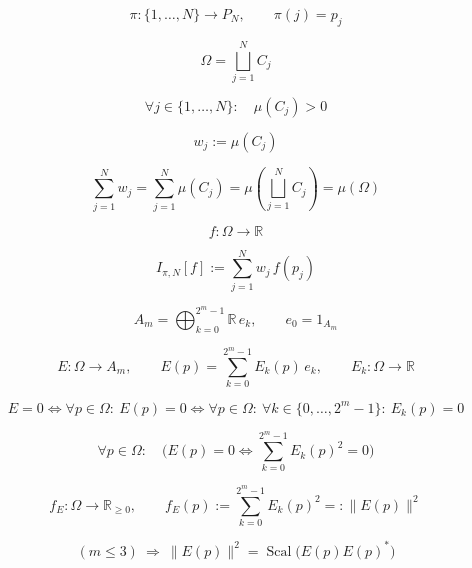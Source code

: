 \documentclass[12pt]{article}
\begin{document}
\begin{equation}
\pi:\{1,\dots,N\}\to P_N,\qquad \pi(j)=p_j
\end{equation}

\begin{equation}
\Omega=\bigsqcup_{j=1}^N C_j
\end{equation}

\begin{equation}
\forall j\in\{1,\dots,N\}:\quad \mu(C_j)>0
\end{equation}

\begin{equation}
w_j:=\mu(C_j)
\end{equation}

\begin{equation}
\sum_{j=1}^N w_j=\sum_{j=1}^N \mu(C_j)=\mu\!\left(\bigsqcup_{j=1}^N C_j\right)=\mu(\Omega)
\end{equation}

\begin{equation}
f:\Omega\to\mathbb{R}
\end{equation}

\begin{equation}
I_{\pi,N}[f]:=\sum_{j=1}^N w_j\,f(p_j)
\end{equation}

\begin{equation}
A_m=\bigoplus_{k=0}^{2^{m}-1}\mathbb{R}\,e_k,\qquad e_0=1_{A_m}
\end{equation}

\begin{equation}
E:\Omega\to A_m,\qquad
E(p)=\sum_{k=0}^{2^{m}-1}E_k(p)\,e_k,\qquad
E_k:\Omega\to\mathbb{R}
\end{equation}

\begin{equation}
E=0
\Longleftrightarrow
\forall p\in\Omega:\ E(p)=0
\Longleftrightarrow
\forall p\in\Omega:\ \forall k\in\{0,\dots,2^{m}-1\}:\ E_k(p)=0
\end{equation}

\begin{equation}
\forall p\in\Omega:\quad
\Big(
E(p)=0
\Longleftrightarrow
\sum_{k=0}^{2^{m}-1}E_k(p)^2=0
\Big)
\end{equation}

\begin{equation}
f_E:\Omega\to\mathbb{R}_{\ge 0},\qquad
f_E(p):=\sum_{k=0}^{2^{m}-1}E_k(p)^2=:\|E(p)\|^2
\end{equation}

\begin{equation}
(m\le 3)\ \Longrightarrow\ \|E(p)\|^2=\operatorname{Scal}\!\big(E(p)E(p)^{*}\big)
\end{equation}
\end{document}
